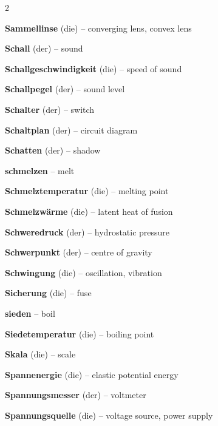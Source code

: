 \begin{multicols}{2}
\par\nopagebreak
\textbf{Sammellinse} (die) -- converging lens, convex lens\dotfill\hyperref[e:241]{\pageref*{e:241}}\par
\textbf{Schall} (der) -- sound\dotfill\hyperref[e:212]{\pageref*{e:212}}\par
\textbf{Schallgeschwindigkeit} (die) -- speed of sound\dotfill\hyperref[e:213]{\pageref*{e:213}}\par
\textbf{Schallpegel} (der) -- sound level\dotfill\hyperref[e:216]{\pageref*{e:216}}\par
\textbf{Schalter} (der) -- switch\dotfill\hyperref[e:157]{\pageref*{e:157}}\par
\textbf{Schaltplan} (der) -- circuit diagram\dotfill\hyperref[e:154]{\pageref*{e:154}}\par
\textbf{Schatten} (der) -- shadow\dotfill\hyperref[e:225]{\pageref*{e:225}}\par
\textbf{schmelzen} -- melt\dotfill\hyperref[e:129]{\pageref*{e:129}}\par
\textbf{Schmelztemperatur} (die) -- melting point\dotfill\hyperref[e:135]{\pageref*{e:135}}\par
\textbf{Schmelzwärme} (die) -- latent heat of fusion\dotfill\hyperref[e:137]{\pageref*{e:137}}\par
\textbf{Schweredruck} (der) -- hydrostatic pressure\dotfill\hyperref[e:90]{\pageref*{e:90}}\par
\textbf{Schwerpunkt} (der) -- centre of gravity\dotfill\hyperref[e:88]{\pageref*{e:88}}\par
\textbf{Schwingung} (die) -- oscillation, vibration\dotfill\hyperref[e:190]{\pageref*{e:190}}\par
\textbf{Sicherung} (die) -- fuse\dotfill\hyperref[e:165]{\pageref*{e:165}}\par
\textbf{sieden} -- boil\dotfill\hyperref[e:132]{\pageref*{e:132}}\par
\textbf{Siedetemperatur} (die) -- boiling point\dotfill\hyperref[e:136]{\pageref*{e:136}}\par
\textbf{Skala} (die) -- scale\dotfill\hyperref[e:12]{\pageref*{e:12}}\par
\textbf{Spannenergie} (die) -- elastic potential energy\dotfill\hyperref[e:99]{\pageref*{e:99}}\par
\textbf{Spannungsmesser} (der) -- voltmeter\dotfill\hyperref[e:161]{\pageref*{e:161}}\par
\textbf{Spannungsquelle} (die) -- voltage source, power supply\dotfill\hyperref[e:155]{\pageref*{e:155}}\par

\end{multicols}
